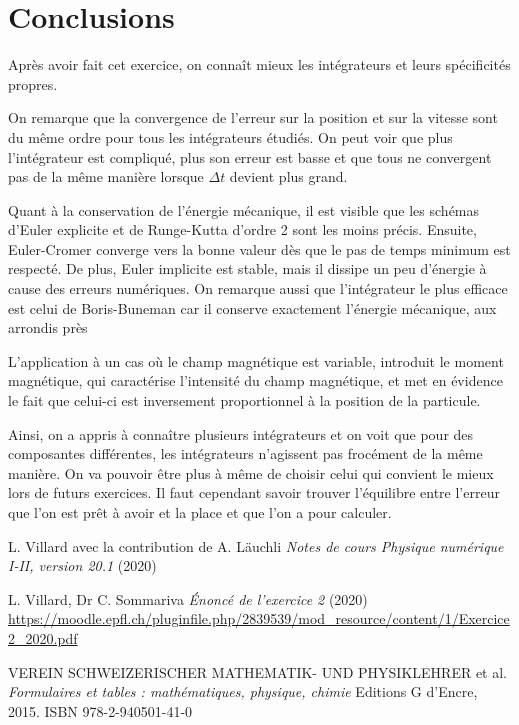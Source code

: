 \documentclass[a4paper,12pt,twoside]{article}
\begin{document}
\section{Conclusions}

 Apr\`es avoir fait cet exercice, on conna\^it mieux les int\'egrateurs et leurs sp\'ecificit\'es propres. 

 On remarque que la convergence de l'erreur sur la position et sur la vitesse sont du m\^eme ordre pour tous les int\'egrateurs \'etudi\'es. 
On peut voir que plus l'int\'egrateur est compliqu\'e, plus son erreur est basse et que tous ne convergent pas de la m\^eme mani\`ere lorsque $\Delta t$ devient plus grand. 

Quant \`a la conservation de l'\'energie m\'ecanique, il est visible que les sch\'emas d'Euler explicite et de Runge-Kutta d'ordre 2 sont les moins pr\'ecis.  Ensuite, Euler-Cromer converge vers la bonne valeur d\`es que le pas de temps minimum est respect\'e. De plus, Euler implicite est stable, mais il dissipe un peu d'\'energie \`a cause des erreurs num\'eriques. 
On remarque aussi que l'int\'egrateur le plus efficace est celui de Boris-Buneman car il conserve exactement l'\'energie m\'ecanique, aux arrondis pr\`es

L'application \`a un cas o\`u le champ magn\'etique est variable, introduit le moment magn\'etique, qui caract\'erise l'intensit\'e du champ magn\'etique, et met en \'evidence le fait que celui-ci est inversement proportionnel \`a la position de la particule.


Ainsi, on a appris \`a conna\^itre plusieurs int\'egrateurs et on voit que pour des composantes diff\'erentes, les int\'egrateurs n'agissent pas froc\'ement de la m\^eme mani\`ere. On va pouvoir \^etre plus \`a m\^eme de choisir celui qui convient le mieux lors de futurs exercices. Il faut cependant savoir trouver l'\'equilibre entre l'erreur que l'on est pr\^et \`a avoir et la place et que l'on a pour calculer.




\begin{thebibliography}{99}
 L. Villard avec la contribution de A. L\"auchli {\it Notes de cours Physique numérique I-II, version 20.1} (2020)
 
 L. Villard, Dr C. Sommariva {\it \'Enonc\'e de l'exercice 2} (2020)
 \url{https://moodle.epfl.ch/pluginfile.php/2839539/mod_resource/content/1/Exercice2_2020.pdf}
 
 VEREIN SCHWEIZERISCHER MATHEMATIK- UND PHYSIKLEHRER  et al. {\it Formulaires et tables : mathématiques, physique, chimie} Editions G d'Encre, 2015. ISBN 978-2-940501-41-0
 
\end{thebibliography}
\end{document}
